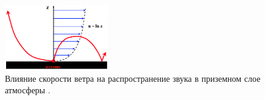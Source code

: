 \begin{figure}[!ht]
\centering
\includegraphics[width=0.4\textwidth]{images/c_s(h)2w.png}
\caption{Влияние скорости ветра на распространение звука в приземном слое атмосферы \cite{Носов-2019-14}.}\label{fig:c_s(h)2w}
\end{figure}
